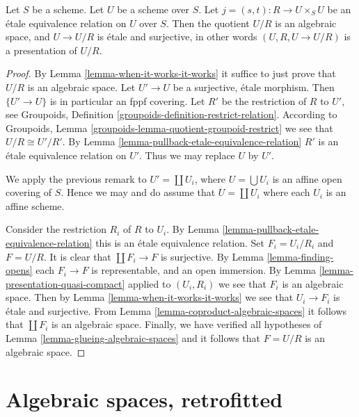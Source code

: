 \begin{theorem}
\label{theorem-presentation}
Let $S$ be a scheme. Let $U$ be a scheme over $S$.
Let $j = (s, t) : R \to U \times_S U$
be an \'etale equivalence relation on $U$ over $S$.
Then the quotient $U/R$ is an algebraic space,
and $U \to U/R$ is \'etale and surjective, in other words
$(U, R, U \to U/R)$ is a presentation of $U/R$.
\end{theorem}

\begin{proof}
By Lemma \ref{lemma-when-it-works-it-works}
it suffice to just prove that $U/R$ is an algebraic space.
Let $U' \to U$ be a surjective, \'etale morphism.
Then $\{U' \to U\}$ is in particular an fppf covering.
Let $R'$ be the restriction of $R$ to $U'$, see
Groupoids, Definition \ref{groupoids-definition-restrict-relation}.
According to
Groupoids, Lemma \ref{groupoids-lemma-quotient-groupoid-restrict}
we see that $U/R \cong U'/R'$.
By Lemma \ref{lemma-pullback-etale-equivalence-relation} $R'$ is an
\'etale equivalence relation on $U'$. Thus we may replace $U$ by $U'$.

\medskip\noindent
We apply the previous remark to $U' = \coprod U_i$, where
$U = \bigcup U_i$ is an affine open covering of $S$. Hence we
may and do assume that $U = \coprod U_i$ where
each $U_i$ is an affine scheme.

\medskip\noindent
Consider the restriction $R_i$ of $R$ to $U_i$.
By Lemma \ref{lemma-pullback-etale-equivalence-relation}
this is an \'etale equivalence relation.
Set $F_i = U_i/R_i$ and $F = U/R$.
It is clear that $\coprod F_i \to F$ is surjective.
By Lemma \ref{lemma-finding-opens} each $F_i \to F$
is representable, and an open immersion.
By Lemma \ref{lemma-presentation-quasi-compact}
applied to $(U_i, R_i)$ we see that $F_i$ is an algebraic space.
Then by Lemma \ref{lemma-when-it-works-it-works} we see that
$U_i \to F_i$ is \'etale and surjective.
From Lemma \ref{lemma-coproduct-algebraic-spaces}
it follows that $\coprod F_i$ is an algebraic space.
Finally, we have verified all
hypotheses of Lemma \ref{lemma-glueing-algebraic-spaces}
and it follows that $F = U/R$ is an algebraic space.
\end{proof}










\section{Algebraic spaces, retrofitted}
\label{section-algebraic-spaces-retrofitted}

